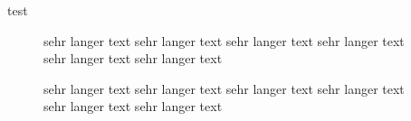 \documentclass[12pt]{scrartcl}
\begin{document}
test
\begin{figure}
	\caption{sehr langer text sehr langer text sehr langer text sehr langer text sehr langer text sehr langer text}
\end{figure}
\captionsetup{labelsep=test}
\begin{figure}
	\caption{sehr langer text sehr langer text sehr langer text sehr langer text sehr langer text sehr langer text}
\end{figure}
\end{document}
